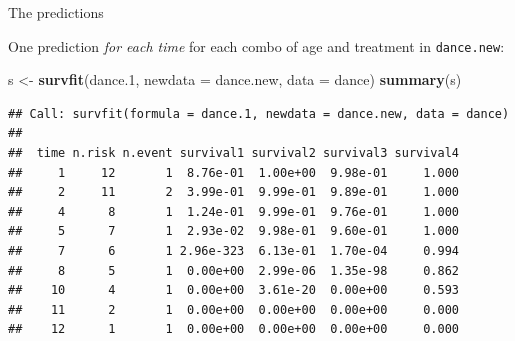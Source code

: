 \documentclass[
  ignorenonframetext,
]{beamer}
\newenvironment{Shaded}{\begin{snugshade}}{\end{snugshade}}
\newcommand{\DataTypeTok}[1]{\textcolor[rgb]{0.13,0.29,0.53}{#1}}
\newcommand{\FloatTok}[1]{\textcolor[rgb]{0.00,0.00,0.81}{#1}}
\newcommand{\KeywordTok}[1]{\textcolor[rgb]{0.13,0.29,0.53}{\textbf{#1}}}
\newcommand{\NormalTok}[1]{#1}
\newcommand{\StringTok}[1]{\textcolor[rgb]{0.31,0.60,0.02}{#1}}
\begin{document}
\begin{frame}[fragile]{The predictions}
\protect\hypertarget{the-predictions-1}{}

One prediction \emph{for each time} for each combo of age and treatment
in \texttt{dance.new}:

\footnotesize

\begin{Shaded}
\begin{Highlighting}[]
\NormalTok{s <-}\StringTok{ }\KeywordTok{survfit}\NormalTok{(dance}\FloatTok{.1}\NormalTok{, }\DataTypeTok{newdata =}\NormalTok{ dance.new, }\DataTypeTok{data =}\NormalTok{ dance)}
\KeywordTok{summary}\NormalTok{(s)}
\end{Highlighting}
\end{Shaded}

\begin{verbatim}
## Call: survfit(formula = dance.1, newdata = dance.new, data = dance)
## 
##  time n.risk n.event survival1 survival2 survival3 survival4
##     1     12       1  8.76e-01  1.00e+00  9.98e-01     1.000
##     2     11       2  3.99e-01  9.99e-01  9.89e-01     1.000
##     4      8       1  1.24e-01  9.99e-01  9.76e-01     1.000
##     5      7       1  2.93e-02  9.98e-01  9.60e-01     1.000
##     7      6       1 2.96e-323  6.13e-01  1.70e-04     0.994
##     8      5       1  0.00e+00  2.99e-06  1.35e-98     0.862
##    10      4       1  0.00e+00  3.61e-20  0.00e+00     0.593
##    11      2       1  0.00e+00  0.00e+00  0.00e+00     0.000
##    12      1       1  0.00e+00  0.00e+00  0.00e+00     0.000
\end{verbatim}

\normalsize

\end{frame}
\end{document}
